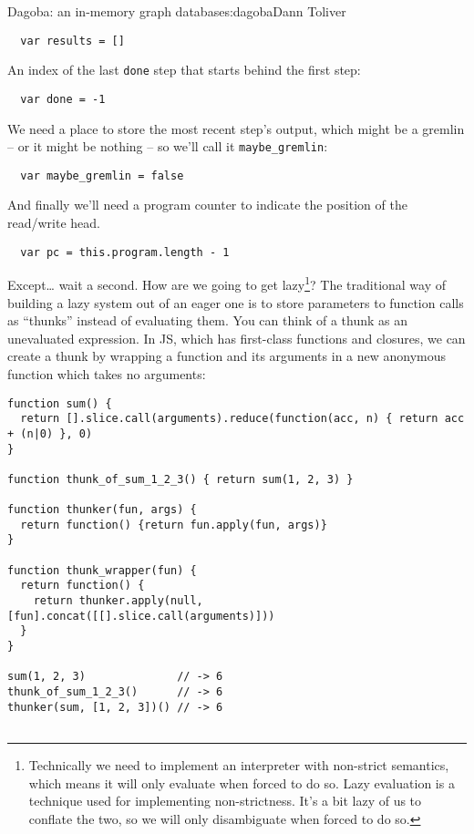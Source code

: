 \begin{aosachapter}{Dagoba: an in-memory graph database}{s:dagoba}{Dann Toliver}
\begin{verbatim}
  var results = []
\end{verbatim}

An index of the last \texttt{done} step that starts behind the first
step:

\begin{verbatim}
  var done = -1
\end{verbatim}

We need a place to store the most recent step's output, which might be a
gremlin -- or it might be nothing -- so we'll call it
\texttt{maybe\_gremlin}:

\begin{verbatim}
  var maybe_gremlin = false
\end{verbatim}

And finally we'll need a program counter to indicate the position of the
read/write head.

\begin{verbatim}
  var pc = this.program.length - 1
\end{verbatim}

Except\ldots{} wait a second. How are we going to get lazy\footnote{Technically
  we need to implement an interpreter with non-strict semantics, which
  means it will only evaluate when forced to do so. Lazy evaluation is a
  technique used for implementing non-strictness. It's a bit lazy of us
  to conflate the two, so we will only disambiguate when forced to do
  so.}? The traditional way of building a lazy system out of an eager
one is to store parameters to function calls as ``thunks'' instead of
evaluating them. You can think of a thunk as an unevaluated expression.
In JS, which has first-class functions and closures, we can create a
thunk by wrapping a function and its arguments in a new anonymous
function which takes no arguments:

\begin{verbatim}
function sum() {
  return [].slice.call(arguments).reduce(function(acc, n) { return acc + (n|0) }, 0)
}

function thunk_of_sum_1_2_3() { return sum(1, 2, 3) }

function thunker(fun, args) {
  return function() {return fun.apply(fun, args)}
}

function thunk_wrapper(fun) {
  return function() {
    return thunker.apply(null, [fun].concat([[].slice.call(arguments)]))
  }
}

sum(1, 2, 3)              // -> 6
thunk_of_sum_1_2_3()      // -> 6
thunker(sum, [1, 2, 3])() // -> 6


\end{verbatim}
\end{aosachapter}
